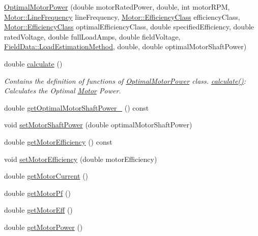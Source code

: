 \begin{DoxyCompactItemize}
\item 
\hyperlink{class_optimal_motor_power_a655953d8e84d386a6e5ea4044098dcc0}{Optimal\+Motor\+Power} (double motor\+Rated\+Power, double, int motor\+R\+PM, \hyperlink{class_motor_acee1bdf1b684ad36cb80dc2829d9fcee}{Motor\+::\+Line\+Frequency} line\+Frequency, \hyperlink{class_motor_afa022971ae062406a9f588c601673d4e}{Motor\+::\+Efficiency\+Class} efficiency\+Class, \hyperlink{class_motor_afa022971ae062406a9f588c601673d4e}{Motor\+::\+Efficiency\+Class} optimal\+Efficiency\+Class, double specified\+Efficiency, double rated\+Voltage, double full\+Load\+Amps, double field\+Voltage, \hyperlink{class_field_data_a424e89914ba5684c01bb269dbe3312fd}{Field\+Data\+::\+Load\+Estimation\+Method}, double, double optimal\+Motor\+Shaft\+Power)
\item 
double \hyperlink{class_optimal_motor_power_a8db12b796c148e0130b261ae138057bf}{calculate} ()
\begin{DoxyCompactList}\small\item\em Contains the definition of functions of \hyperlink{class_optimal_motor_power}{Optimal\+Motor\+Power} class. \hyperlink{class_optimal_motor_power_a8db12b796c148e0130b261ae138057bf}{calculate()}\+: Calculates the Optimal \hyperlink{class_motor}{Motor} Power. \end{DoxyCompactList}\item 
double \hyperlink{class_optimal_motor_power_af902365015880d5f11d865465672d7bb}{get\+Optimal\+Motor\+Shaft\+Power\+\_\+} () const
\item 
void \hyperlink{class_optimal_motor_power_ada8a9e3caac34c54470ad13ffe7edf53}{set\+Motor\+Shaft\+Power} (double optimal\+Motor\+Shaft\+Power)
\item 
double \hyperlink{class_optimal_motor_power_a10b3528bec621cab146608c6326526e3}{get\+Motor\+Efficiency} () const
\item 
void \hyperlink{class_optimal_motor_power_a297acce2fcd06a57108fb52058a61cac}{set\+Motor\+Efficiency} (double motor\+Efficiency)
\item 
double \hyperlink{class_optimal_motor_power_a2c058c4320a840018a420e10272cc4dd}{get\+Motor\+Current} ()
\item 
double \hyperlink{class_optimal_motor_power_a94d4c8a84c1bd19b799e35b966368f5a}{get\+Motor\+Pf} ()
\item 
double \hyperlink{class_optimal_motor_power_a341fe7520227f27f9cce23f3dc4cb0cb}{get\+Motor\+Eff} ()
\item 
double \hyperlink{class_optimal_motor_power_af35a32c24df9198bcf0df5b8f6ea03a9}{get\+Motor\+Power} ()
\end{DoxyCompactItemize}


